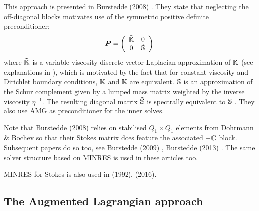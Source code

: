 This approach is presented in Burstedde \etal (2008) \cite{bugg08}.
They state that neglecting the off-diagonal blocks motivates use of the symmetric
positive definite preconditioner:
\[
{\bm P} = \left(
\begin{array}{cc}
\tilde{{\mathbb{K}}} & 0 \\
0 & \tilde{{\mathbb{S}}}
\end{array}
\right)
\]
where $\tilde{{\mathbb{K}}}$ is a variable-viscosity discrete vector Laplacian
approximation of ${\mathbb{K}}$ (see explanations in \cite{bugs09}), 
which is motivated by the fact that
for constant viscosity and Dirichlet boundary conditions,
${\mathbb{K}}$ and $\tilde{{\mathbb{K}}}$ are equivalent. 
$\tilde{{\mathbb{S}}}$ is an approximation of
the Schur complement given by a lumped mass matrix
weighted by the inverse viscosity $\eta^{-1}$. The resulting
diagonal matrix $\tilde{{\mathbb{S}}}$ is spectrally equivalent to ${\mathbb{S}}$ \cite{elsw}.
They also use AMG as preconditioner for the inner solves. 

Note that Burstedde \etal  (2008) \cite{bugg08} relies on stabilised 
$Q_1\times Q_1$ elements from Dohrmann \& Bochev \cite{dobo04} 
so that their Stokes matrix does feature the associated $-{\mathbb{C}}$ block.
Subsequent papers do so too, see Burstedde \etal (2009) \cite{bugs09}, 
Burstedde \etal (2013) \cite{busa13}.
The same solver structure based on MINRES is used in these articles too.

MINRES for Stokes is also used in \textcite{ruwi92} (1992), 
\textcite{musm16} (2016).

\subsection{The Augmented Lagrangian approach}


